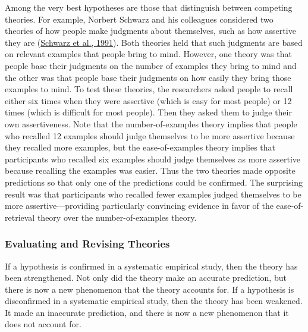 \documentclass[
]{krantz}
\begin{document}
Among the very best hypotheses are those that distinguish between competing theories. For example, Norbert Schwarz and his colleagues considered two theories of how people make judgments about themselves, such as how assertive they are (\protect\hyperlink{ref-schwarz1991ease}{Schwarz et al., 1991}). Both theories held that such judgments are based on relevant examples that people bring to mind. However, one theory was that people base their judgments on the number of examples they bring to mind and the other was that people base their judgments on how easily they bring those examples to mind. To test these theories, the researchers asked people to recall either six times when they were assertive (which is easy for most people) or 12 times (which is difficult for most people). Then they asked them to judge their own assertiveness. Note that the number-of-examples theory implies that people who recalled 12 examples should judge themselves to be more assertive because they recalled more examples, but the ease-of-examples theory implies that participants who recalled six examples should judge themselves as more assertive because recalling the examples was easier. Thus the two theories made opposite predictions so that only one of the predictions could be confirmed. The surprising result was that participants who recalled fewer examples judged themselves to be more assertive---providing particularly convincing evidence in favor of the ease-of-retrieval theory over the number-of-examples theory.

\hypertarget{evaluating-and-revising-theories}{%
\subsubsection*{Evaluating and Revising Theories}\label{evaluating-and-revising-theories}}


If a hypothesis is confirmed in a systematic empirical study, then the theory has been strengthened. Not only did the theory make an accurate prediction, but there is now a new phenomenon that the theory accounts for. If a hypothesis is disconfirmed in a systematic empirical study, then the theory has been weakened. It made an inaccurate prediction, and there is now a new phenomenon that it does not account for.
\end{document}

